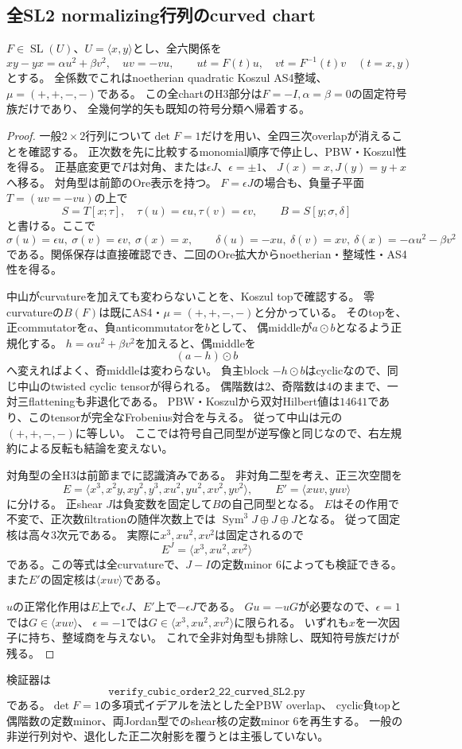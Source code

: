 \subsection{全SL2 normalizing行列のcurved chart}
\label{subsec:h3-order2-22-curved-SL2}
\begin{theorem}\label{thm:h3-order2-22-curved-SL2}
$F\in\operatorname{SL}(U)$、$U=\langle x,y\rangle$とし、全六関係を
\[
 xy-yx=\alpha u^2+\beta v^2,\quad uv=-vu,\qquad
 ut=F(t)u,\quad vt=F^{-1}(t)v\quad(t=x,y)
\]
とする。
全係数でこれはnoetherian quadratic Koszul AS4整域、$\mu=(+,+,-,-)$である。
この全chartのH3部分は$F=-I,\alpha=\beta=0$の固定符号族だけであり、
全幾何学的矢も既知の符号分類へ帰着する。
\end{theorem}
\begin{proof}
一般$2\times2$行列について$\det F=1$だけを用い、全四三次overlapが消えることを確認する。
正次数を先に比較するmonomial順序で停止し、PBW・Koszul性を得る。
正基底変更で$F$は対角、または$\epsilon J$、$\epsilon=\pm1$、
$J(x)=x,J(y)=y+x$へ移る。
対角型は前節のOre表示を持つ。
$F=\epsilon J$の場合も、負量子平面$T=(uv=-vu)$の上で
\[
 S=T[x;\tau],\quad\tau(u)=\epsilon u,\tau(v)=\epsilon v,
 \qquad B=S[y;\sigma,\delta]
\]
と書ける。ここで
\[
 \sigma(u)=\epsilon u,\ \sigma(v)=\epsilon v,\ \sigma(x)=x,\qquad
 \delta(u)=-xu,\ \delta(v)=xv,\ \delta(x)=-\alpha u^2-\beta v^2
\]
である。関係保存は直接確認でき、二回のOre拡大からnoetherian・整域性・AS4性を得る。

中山がcurvatureを加えても変わらないことを、Koszul topで確認する。
零curvatureの$B(F)$は既にAS4・$\mu=(+,+,-,-)$と分かっている。
そのtopを、正commutatorを$a$、負anticommutatorを$b$として、
偶middleが$a\mathbin{\odot}b$となるよう正規化する。
$h=\alpha u^2+\beta v^2$を加えると、偶middleを
\[
 (a-h)\mathbin{\odot}b
\]
へ変えればよく、奇middleは変わらない。
負主block $-h\mathbin{\odot}b$はcyclicなので、同じ中山のtwisted cyclic tensorが得られる。
偶階数は2、奇階数は4のままで、一対三flatteningも非退化である。
PBW・Koszulから双対Hilbert値は$14641$であり、このtensorが完全なFrobenius対合を与える。
従って中山は元の$(+,+,-,-)$に等しい。
ここでは符号自己同型が逆写像と同じなので、右左規約による反転も結論を変えない。

対角型の全H3は前節までに認識済みである。
非対角二型を考え、正三次空間を
\[
 E=\langle x^3,x^2y,xy^2,y^3,xu^2,yu^2,xv^2,yv^2\rangle,
 \qquad E'=\langle xuv,yuv\rangle
\]
に分ける。
正shear $J$は負変数を固定して$B$の自己同型となる。
$E$はその作用で不変で、正次数filtrationの随伴次数上では
$\operatorname{Sym}^3J\oplus J\oplus J$となる。
従って固定核は高々3次元である。
実際に$x^3,xu^2,xv^2$は固定されるので
\[
 E^J=\langle x^3,xu^2,xv^2\rangle
\]
である。この等式は全curvatureで、$J-I$の定数minor 6によっても検証できる。
また$E'$の固定核は$\langle xuv\rangle$である。

$u$の正常化作用は$E$上で$\epsilon J$、$E'$上で$-\epsilon J$である。
$Gu=-uG$が必要なので、$\epsilon=1$では$G\in\langle xuv\rangle$、
$\epsilon=-1$では$G\in\langle x^3,xu^2,xv^2\rangle$に限られる。
いずれも$x$を一次因子に持ち、整域商を与えない。
これで全非対角型も排除し、既知符号族だけが残る。
\end{proof}

検証器は
\[
 \texttt{verify\_cubic\_order2\_22\_curved\_SL2.py}
\]
である。$\det F=1$の多項式イデアルを法とした全PBW overlap、
cyclic負topと偶階数の定数minor、両Jordan型でのshear核の定数minor 6を再生する。
一般の非逆行列対や、退化した正二次射影を覆うとは主張していない。
